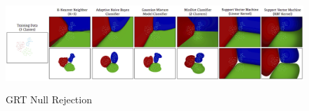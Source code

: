 \begin{figure}
	[h] \centering 
	\includegraphics[height=35mm]{figures/content/grt-null.png} \caption{GRT Null Rejection} \label{fg:grt:null} 
\end{figure}
